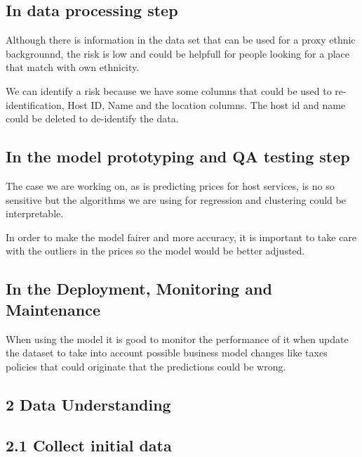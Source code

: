\hypertarget{in-data-processing-step}{%
\subsection{In data processing step}\label{in-data-processing-step}}

Although there is information in the data set that can be used for a
proxy ethnic backgrounnd, the risk is low and could be helpfull for
people looking for a place that match with own ethnicity.

We can identify a risk because we have some columns that could be used
to re-identification, Host ID, Name and the location columns. The host
id and name could be deleted to de-identify the data.

\hypertarget{in-the-model-prototyping-and-qa-testing-step}{%
\subsection{In the model prototyping and QA testing
step}\label{in-the-model-prototyping-and-qa-testing-step}}

The case we are working on, as is predicting prices for host services,
is no so sensitive but the algorithms we are using for regression and
clustering could be interpretable.

In order to make the model fairer and more accuracy, it is important to
take care with the outliers in the prices so the model would be better
adjusted.

\hypertarget{in-the-deployment-monitoring-and-maintenance}{%
\subsection{In the Deployment, Monitoring and
Maintenance}\label{in-the-deployment-monitoring-and-maintenance}}

When using the model it is good to monitor the performance of it when
update the dataset to take into account possible business model changes
like taxes policies that could originate that the predictions could be
wrong.

\hypertarget{data-understanding}{%
\subsection{2 Data Understanding}\label{data-understanding}}

\hypertarget{collect-initial-data}{%
\subsection{2.1 Collect initial data}\label{collect-initial-data}}

